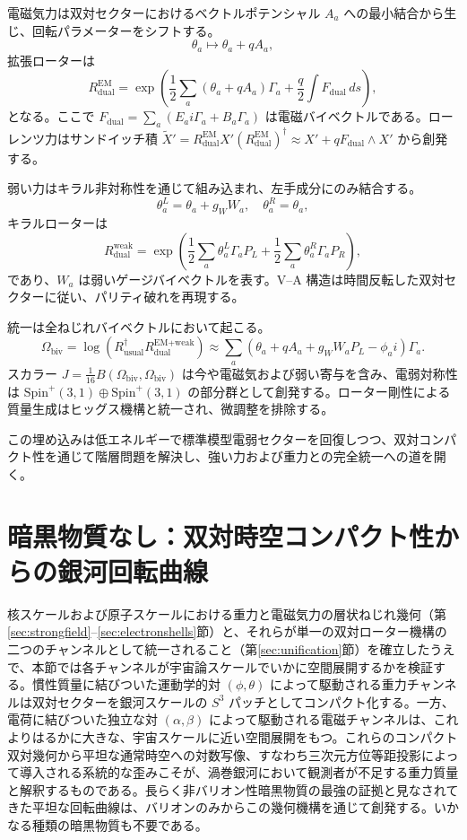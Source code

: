 \documentclass[dvipdfmx,a4paper]{article}
\begin{document}
電磁気力は双対セクターにおけるベクトルポテンシャル $A_a$ への最小結合から生じ、回転パラメーターをシフトする。
\[
\theta_a \mapsto \theta_a + q A_a,
\]
拡張ローターは
\[
R_{\text{dual}}^{\text{EM}} = \exp\left( \frac{1}{2} \sum_a (\theta_a + q A_a) \Gamma_a + \frac{q}{2} \int F_{\text{dual}} \, ds \right),
\]
となる。ここで $F_{\text{dual}} = \sum_a (E_a i \Gamma_a + B_a \Gamma_a)$ は電磁バイベクトルである。ローレンツ力はサンドイッチ積 $\tilde{X}' = R_{\text{dual}}^{\text{EM}} X' (R_{\text{dual}}^{\text{EM}})^\dagger \approx X' + q F_{\text{dual}} \wedge X'$ から創発する。

弱い力はキラル非対称性を通じて組み込まれ、左手成分にのみ結合する。
\[
\theta_a^L = \theta_a + g_W W_a, \quad \theta_a^R = \theta_a,
\]
キラルローターは
\[
R_{\text{dual}}^{\text{weak}} = \exp\left( \frac{1}{2} \sum_a \theta_a^L \Gamma_a P_L + \frac{1}{2} \sum_a \theta_a^R \Gamma_a P_R \right),
\]
であり、$W_a$ は弱いゲージバイベクトルを表す。V--A 構造は時間反転した双対セクターに従い、パリティ破れを再現する。

統一は全ねじれバイベクトルにおいて起こる。
\[
\Omega_{\text{biv}} = \log\left( R_{\text{usual}}^\dagger R_{\text{dual}}^{\text{EM+weak}} \right) \approx \sum_a (\theta_a + q A_a + g_W W_a P_L - \phi_a i) \Gamma_a.
\]
スカラー $J = \frac{1}{16} B(\Omega_{\text{biv}}, \Omega_{\text{biv}})$ は今や電磁気および弱い寄与を含み、電弱対称性は $\mathrm{Spin}^+(3,1) \oplus \mathrm{Spin}^+(3,1)$ の部分群として創発する。ローター剛性による質量生成はヒッグス機構と統一され、微調整を排除する。

この埋め込みは低エネルギーで標準模型電弱セクターを回復しつつ、双対コンパクト性を通じて階層問題を解決し、強い力および重力との完全統一への道を開く。

\section{暗黒物質なし：双対時空コンパクト性からの銀河回転曲線}
\label{sec:darkmatter}

核スケールおよび原子スケールにおける重力と電磁気力の層状ねじれ幾何（第\ref{sec:strongfield}--\ref{sec:electronshells}節）と、それらが単一の双対ローター機構の二つのチャンネルとして統一されること（第\ref{sec:unification}節）を確立したうえで、本節では各チャンネルが宇宙論スケールでいかに空間展開するかを検証する。慣性質量に結びついた運動学的対 $(\phi, \theta)$ によって駆動される重力チャンネルは双対セクターを銀河スケールの $S^3$ パッチとしてコンパクト化する。一方、電荷に結びついた独立な対 $(\alpha, \beta)$ によって駆動される電磁チャンネルは、これよりはるかに大きな、宇宙スケールに近い空間展開をもつ。これらのコンパクト双対幾何から平坦な通常時空への対数写像、すなわち三次元方位等距投影によって導入される系統的な歪みこそが、渦巻銀河において観測者が不足する重力質量と解釈するものである。長らく非バリオン性暗黒物質の最強の証拠と見なされてきた平坦な回転曲線は、バリオンのみからこの幾何機構を通じて創発する。いかなる種類の暗黒物質も不要である。
\end{document}
